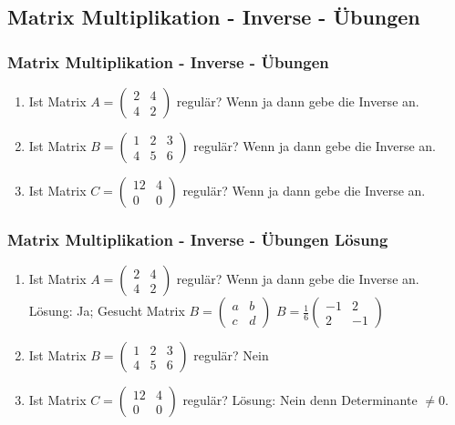 \subsection{Matrix Multiplikation - Inverse - Übungen}
\begin{frame}
\frametitle{Matrix Multiplikation - Inverse - Übungen}
\begin{enumerate}
\item Ist Matrix $A = \begin{pmatrix} 2 & 4 \\ 4 & 2 \end{pmatrix}$ regulär? Wenn ja dann gebe die Inverse an.
\item Ist Matrix $B = \begin{pmatrix} 1 & 2 & 3 \\ 4 & 5 & 6 \end{pmatrix}$ regulär? Wenn ja dann gebe die Inverse an.
\item Ist Matrix $C = \begin{pmatrix} 12 & 4 \\ 0 & 0  \end{pmatrix}$ regulär? Wenn ja dann gebe die Inverse an.
\end{enumerate}
\end{frame}

\begin{frame}
\frametitle{Matrix Multiplikation - Inverse - Übungen Lösung}
\begin{enumerate}
\item Ist Matrix $A = \begin{pmatrix} 2 & 4 \\ 4 & 2 \end{pmatrix}$ regulär? Wenn ja dann gebe die Inverse an. \\
Lösung: Ja; Gesucht Matrix $B = \begin{pmatrix} a & b \\ c & d \end{pmatrix}$
$B = \frac{1}{6}\begin{pmatrix} -1 & 2 \\ 2 & -1 \end{pmatrix}$
\item Ist Matrix $B = \begin{pmatrix} 1 & 2 & 3 \\ 4 & 5 & 6 \end{pmatrix}$ regulär? Nein
\item  Ist Matrix $C = \begin{pmatrix} 12 & 4 \\ 0 & 0  \end{pmatrix}$ regulär?
Lösung: Nein denn Determinante $\neq 0$.
\end{enumerate}
\end{frame}



















